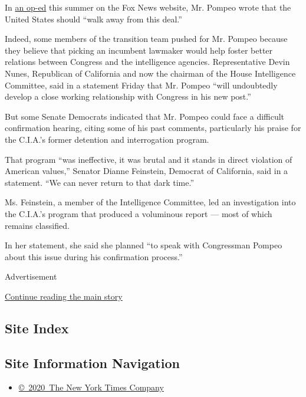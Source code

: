 In
\href{http://www.foxnews.com/opinion/2016/07/14/rep-mike-pompeo-one-year-later-obama-s-iran-nuclear-deal-puts-us-at-increased-risk.html}{an
op-ed} this summer on the Fox News website, Mr. Pompeo wrote that the
United States should ``walk away from this deal.''

Indeed, some members of the transition team pushed for Mr. Pompeo
because they believe that picking an incumbent lawmaker would help
foster better relations between Congress and the intelligence agencies.
Representative Devin Nunes, Republican of California and now the
chairman of the House Intelligence Committee, said in a statement Friday
that Mr. Pompeo ``will undoubtedly develop a close working relationship
with Congress in his new post.''

But some Senate Democrats indicated that Mr. Pompeo could face a
difficult confirmation hearing, citing some of his past comments,
particularly his praise for the C.I.A.'s former detention and
interrogation program.

That program ``was ineffective, it was brutal and it stands in direct
violation of American values,'' Senator Dianne Feinstein, Democrat of
California, said in a statement. ``We can never return to that dark
time.''

Ms. Feinstein, a member of the Intelligence Committee, led an
investigation into the C.I.A.'s program that produced a voluminous
report --- most of which remains classified.

In her statement, she said she planned ``to speak with Congressman
Pompeo about this issue during his confirmation process.''

Advertisement

\protect\hyperlink{after-bottom}{Continue reading the main story}

\hypertarget{site-index}{%
\subsection{Site Index}\label{site-index}}

\hypertarget{site-information-navigation}{%
\subsection{Site Information
Navigation}\label{site-information-navigation}}

\begin{itemize}
\tightlist
\item
  \href{https://help.nytimes.com/hc/en-us/articles/115014792127-Copyright-notice}{©~2020~The
  New York Times Company}
\end{itemize}

